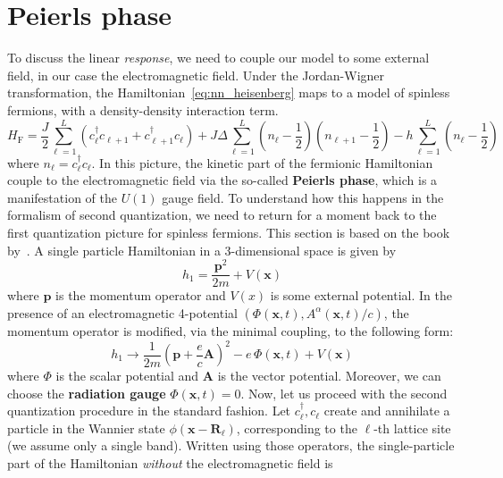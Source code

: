 \section{Peierls phase}
To discuss the linear \textit{response}, we need to couple our model to some external field, in our
case the electromagnetic field. Under the Jordan-Wigner transformation, the Hamiltonian~\eqref{eq:nn_heisenberg}
maps to a model of spinless fermions, with a density-density interaction term.
\begin{equation}
    H_{\text{F} } = \frac{J}{2}\sum_{\ell=1}^{L} \left( c_{\ell}^{\dagger} c_{\ell+1} + c_{\ell+1}^{\dagger} c_{\ell} \right)
    + J \Delta \sum_{\ell=1}^{L} \left(n_{\ell} - \frac{1}{2}\right)\left(n_{\ell+1}-\frac{1}{2}\right)
    - h \sum_{\ell=1}^{L} \left(n_{\ell} - \frac{1}{2}\right)
\end{equation}
where \(n_{\ell} = c^{\dag}_{\ell}c_{\ell}\).
In this picture, the kinetic part of the fermionic Hamiltonian couple to the electromagnetic field
via the so-called \textbf{Peierls phase}, which is a manifestation of the \(U(1)\) gauge field. To understand
how this happens in the formalism of second quantization, we need to return for a moment back to the
first quantization picture for spinless fermions. This section is based on the book by~\textcite{Essler2005}.
A single particle Hamiltonian in a 3-dimensional space is given by
\begin{equation}
    h_{1} = \frac{\mathbf{p}^{2}}{2m} + V(\mathbf{x} )
\end{equation}
where \(\mathbf{p}\) is the momentum operator and \(V(x)\) is some external potential. In the presence of an
electromagnetic 4-potential \(\left(\Phi(\mathbf{x},t ), A^{\alpha }(\mathbf{x} ,t)/c\right)\),
the momentum operator is modified, via the minimal coupling, to the following form:
\begin{equation}
    h_{1} \to \frac{1}{2m}\left(\mathbf{p} + \frac{e}{c}\mathbf{A}\right)^{2} - e\,\Phi(\mathbf{x},t) + V(\mathbf{x} )
\end{equation}
where \(\Phi \) is the scalar potential and \(\mathbf{A}\) is the vector potential.
Moreover, we can choose the \textbf{radiation gauge} \(\Phi(\mathbf{x} ,t) = 0\).
Now, let us proceed with the second quantization procedure in the standard fashion. Let
\(c^{\dag}_{\ell},c_{\ell}\) create and annihilate a particle in the Wannier state \(\phi(\mathbf{x - \mathbf{R}_{\ell}})\),
corresponding to the \(\ell\)-th lattice site (we assume only a single band).
Written using those operators, the single-particle part of the Hamiltonian \textit{without} the electromagnetic field is
